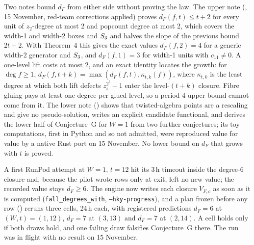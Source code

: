 Two notes bound $d_F$ from either side without proving the law. The upper
note (,
15 November, red-team corrections applied) proves
$d_F(f,t)\le t+2$ for every unit of $z_2$-degree at most 2 and popcount
degree at most 2, which covers the width-1 and width-2 boxes and $S_{3}$ and
halves the slope of the previous bound $2t+2$. With Theorem~4 this gives the
exact values $d_F(f,2)=4$ for a generic width-2 generator and $S_{3}$, and
$d_F(f,1)=3$ for width-1 units with $c_{11}\ne0$. A one-level lift costs at
most 2, and an exact identity locates the growth: for $\deg f\ge1$,
$d_F(f,t+k)=\max(d_F(f,t),\kappa_{t,k}(f))$, where $\kappa_{t,k}$ is the
least degree at which both lift defects $z_i^{2^t}-1$ enter the level-$(t+k)$
closure. Fibre gluing pays at least one degree per glued level, so a
period-4 upper bound cannot come from it. The lower note
()
shows that twisted-algebra points are a rescaling and give no
pseudo-solution, writes an explicit candidate functional, and derives the
lower half of Conjecture~G for $W=1$ from two further conjectures; its toy
computations, first in Python and so not admitted, were reproduced value
for value by a native Rust port on 15 November. No lower bound on $d_F$ that
grows with $t$ is proved.

A first RunPod attempt at $W=1$, $t=12$ hit its 3\,h timeout inside the
degree-6 closure and, because the pilot wrote rows only at exit, left no new
value; the recorded value stays $d_F\ge6$. The engine now writes each
closure $V_{F,c}$ as soon as it is computed (\texttt{fall\_degrees\_with},
\texttt{--hky-progress}), and a plan frozen before any row
()
reruns three cells, 24\,h each, with registered predictions $d_F=6$ at
$(W,t)=(1,12)$, $d_F=7$ at $(3,13)$ and $d_F=7$ at $(2,14)$. A cell holds
only if both draws hold, and one failing draw falsifies Conjecture~G there.
The run was in flight with no result on 15 November.

